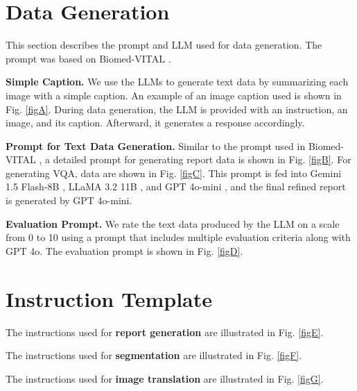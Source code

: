 \section{Data Generation}
\label{sec:C}
This section describes the prompt and LLM used for data generation. The prompt was based on Biomed-VITAL \cite{cui2024biomedical}.

\vspace{3pt}
\noindent \textbf{Simple Caption.} We use the LLMs to generate text data by summarizing each image with a simple caption. An example of an image caption used is shown in Fig. \ref{figA}. During data generation, the LLM is provided with an instruction, an image, and its caption. Afterward, it generates a response accordingly.

\vspace{3pt}
\noindent \textbf{Prompt for Text Data Generation.} Similar to the prompt used in Biomed-VITAL \cite{cui2024biomedical}, a detailed prompt for generating report data is shown in Fig. \ref{figB}. For generating VQA, data are shown in Fig. \ref{figC}. This prompt is fed into Gemini 1.5 Flash-8B \cite{team2023gemini}, LLaMA 3.2 11B \cite{grattafiori2024llama3herdmodels}, and GPT 4o-mini \cite{achiam2023gpt}, and the final refined report is generated by GPT 4o-mini.

\vspace{3pt}
\noindent \textbf{Evaluation Prompt.} We rate the text data produced by the LLM on a scale from 0 to 10 using a prompt that includes multiple evaluation criteria along with GPT 4o. The evaluation prompt is shown in Fig. \ref{figD}.

\section{Instruction Template}
\label{sec:D}

\noindent The instructions used for \textbf{report generation} are illustrated in Fig. \ref{figE}.

\vspace{3pt}
\noindent The instructions used for \textbf{segmentation} are illustrated in Fig. \ref{figF}.

\vspace{3pt}
\noindent The instructions used for \textbf{image translation} are illustrated in Fig. \ref{figG}.

\clearpage

